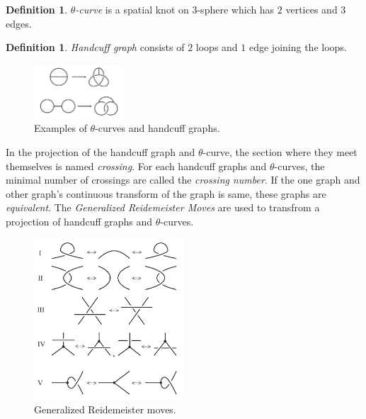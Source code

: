 \documentclass{article}
\theoremstyle{definition}
\newtheorem{defn}[thm]{Definition}
\theoremstyle{theorem}
\theoremstyle{proposition}
\theoremstyle{corollary}
\begin{document}
\begin{defn}
    \textit{$\theta$-curve} is a spatial knot on $3$-sphere which has $2$ vertices and $3$ edges. 
\end{defn}
\begin{defn}
    \textit{Handcuff graph} consists of $2$ loops and $1$ edge joining the loops.
\end{defn}

\begin{figure}[h]
    \centerline{\includegraphics[width=0.3\textwidth]{figure/theta and handcuff graph.png}}
    \caption{Examples of $\theta$-curves and handcuff graphs.}
    \label{figure_1} 
\end{figure}

In the projection of the handcuff graph and $\theta$-curve, the section where they meet themselves is named \textit{crossing}. 
For each handcuff graphs and $\theta$-curves, the minimal number of crossings are called the \textit{crossing number}.
If the one graph and other graph's continuous transform of the graph is same, these graphs are \textit{equivalent}. 
The \textit{Generalized Reidemeister Moves} are used to transfrom a projection of handcuff graphs and $\theta$-curves.\\

\begin{figure}[h]
    \centerline{\includegraphics[width=0.5\textwidth]{figure/reidemeister.png}}
    \caption{Generalized Reidemeister moves.}
    \label{figure_1} 
\end{figure}
\end{document}
